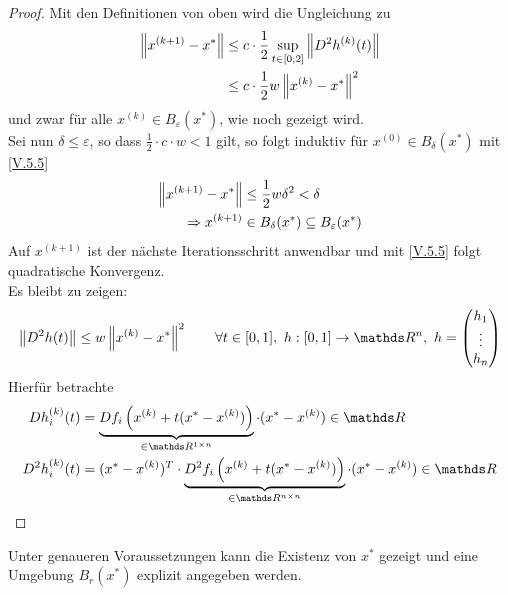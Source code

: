 \begin{proof}
  Mit den Definitionen von oben wird die Ungleichung zu
  \begin{align}\nonumber
    \left\| x^{(k+1)}-x^{*} \right\| &\leq c\cdot \frac{1}{2} \sup_{t\in[0,2]} \left\| D^2h^{(k)}(t) \right\| \\
                         & \leq c\cdot \frac{1}{2} w\left\| x^{(k)}-x^{*} \right\|^2
                           \label{V.5.5}
  \end{align}
  und zwar für alle $x^{(k)}\in B_\varepsilon(x^{*})$, wie noch gezeigt wird.\\
  Sei nun $\delta \leq \varepsilon$, so dass $\frac{1}{2} \cdot c\cdot w <1$ gilt,
  so folgt induktiv für $x^{(0)}\in B_\delta(x^{*})$ mit \eqref{V.5.5}
  \begin{align*}
    \left\| x^{(k+1)}-x^{*} \right\| &\leq \frac{1}{2}w\delta^2 < \delta\\
    \Rightarrow x^{(k+1)}&\in B_\delta(x^{*})\subseteq B_\varepsilon(x^{*})
  \end{align*}
  Auf $x^{(k+1)} $ ist der nächste Iterationsschritt anwendbar
  und mit \eqref{V.5.5} folgt quadratische Konvergenz.\\
  Es bleibt zu zeigen:
  \begin{gather*}
    \nn{D^2h(t)} \leq w\nn{x^{(k)}-x^{*}}^2 \qquad \forall t\in [0,1],~
    h:[0,1]\rightarrow\Ren,~ h=\begin{pmatrix} h_1 \\ \vdots \\ h_n \end{pmatrix}
  \end{gather*}
  Hierfür betrachte
  \begin{align*}
    Dh_i^{(k)}(t)&=\underbrace{Df_i\left( x^{(k)}+t(x^{*}-x^{(k)})\right)}_{\in \R^{1\times n}}
                   \cdot (x^{*}-x^{(k)})\in\R\\
    D^2h_i^{(k)}(t)&=(x^{*}-x^{(k)})^T\cdot
                     \underbrace{D^2f_i\left( x^{(k)}+t(x^{*}-x^{(k)})\right)}_{\in \R^{n\times n}}
                     \cdot (x^{*}-x^{(k)})\in\R\\
  \end{align*}
\end{proof}

Unter genaueren Voraussetzungen kann die Existenz von $x^{*}$ gezeigt 
und eine Umgebung $B_r(x^{*})$ explizit angegeben werden.

